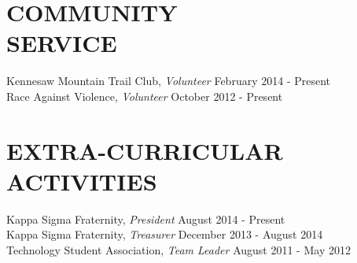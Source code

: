 \documentclass[margin, 10pt]{res} %
\begin{document}
\begin{resume}
       \section{COMMUNITY \\ SERVICE}

       Kennesaw Mountain Trail Club, {\sl Volunteer} \hfill February 2014 - Present \\
       Race Against Violence, {\sl Volunteer} \hfill October 2012 - Present \\


       \section{EXTRA-CURRICULAR \\ ACTIVITIES}

       Kappa Sigma Fraternity, {\sl President} \hfill August 2014 - Present\\
       Kappa Sigma Fraternity, {\sl Treasurer} \hfill December 2013 - August 2014 \\
       Technology Student Association, {\sl Team Leader} \hfill August 2011 - May 2012 \\



        \end{resume}
        
\end{document}
